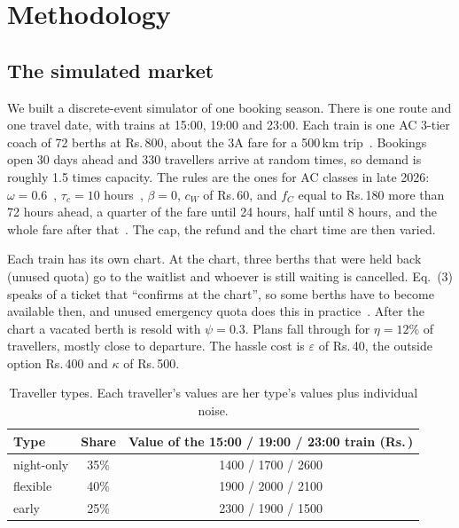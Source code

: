 \documentclass{article}
\newcommand{\rs}{Rs.\,}
\theoremstyle{definition}
\begin{document}
\section{Methodology}

\subsection{The simulated market}

We built a discrete-event simulator of one booking season. There is one route and one
travel date, with trains at 15:00, 19:00 and 23:00. Each train is one AC 3-tier coach of 72
berths at \rs800, about the 3A fare for a 500\,km trip~\cite{fare}. Bookings open 30 days
ahead and 330 travellers arrive at random times, so demand is roughly 1.5 times capacity.
The rules are the ones for AC classes in late 2026: $\omega=0.6$~\cite{cap},
$\tau_c=10$ hours~\cite{chart10}, $\beta=0$, $c_W$ of \rs60, and $f_C$ equal to \rs180 more
than 72 hours ahead, a quarter of the fare until 24 hours, half until 8 hours, and the
whole fare after that~\cite{slabs,irctc}. The cap, the refund and the chart time are then
varied.

Each train has its own chart. At the chart, three berths that were held back (unused
quota) go to the waitlist and whoever is still waiting is cancelled. Eq.~(3) speaks of a
ticket that ``confirms at the chart'', so some berths have to become available then, and
unused emergency quota does this in practice~\cite{eq}. After the chart a vacated berth is
resold with $\psi=0.3$. Plans fall through for $\eta=12\%$ of travellers, mostly close to
departure. The hassle cost is $\varepsilon$ of \rs40, the outside option \rs400 and
$\kappa$ of \rs500.

\begin{table}[ht]
\caption{Traveller types. Each traveller's values are her type's values plus individual noise.}
\label{tab:types}
\centering
\small
\begin{tabular}{lcc}
\toprule
Type & Share & Value of the 15:00 / 19:00 / 23:00 train (\rs) \\
\midrule
night-only & 35\% & 1400 / 1700 / 2600 \\
flexible   & 40\% & 1900 / 2000 / 2100 \\
early      & 25\% & 2300 / 1900 / 1500 \\
\bottomrule
\end{tabular}
\end{table}
\end{document}
